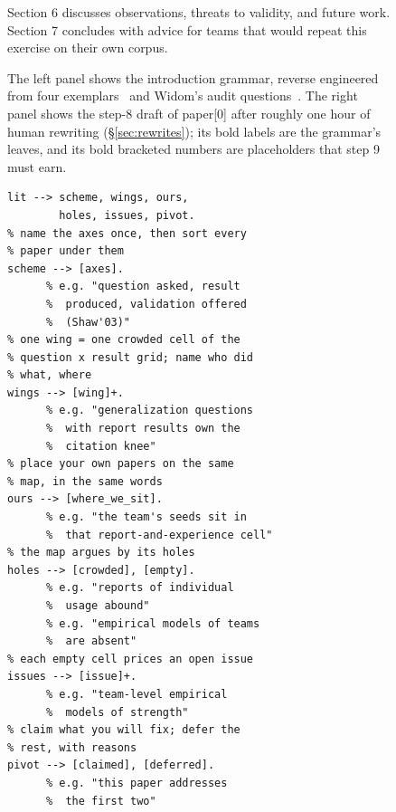 \begin{figure}[p]
{\begin{minipage}[t]{\dimexpr0.62\textwidth-2\fboxsep-2\fboxrule}
Section 6 discusses observations, threats to validity, and future
work.
Section 7 concludes with advice for teams that would repeat this
exercise on their own corpus.
\end{minipage}}
\vspace{6mm}
\caption{The left panel shows the introduction grammar, reverse
engineered from four
exemplars~\cite{shannon40,kocaguneli12,fu17,ladisa23} and Widom's
audit questions~\cite{widom06}.
The right panel shows the step-8 draft of {\ttfamily paper[0]}
after roughly one hour of human rewriting
(\S\ref{sec:rewrites}); its bold labels are the grammar's leaves,
and its bold bracketed numbers are placeholders that step 9 must
earn.}
\label{fig:introbnf}
\label{fig:sample}
\end{figure}

\begin{figure}[t!]
\begin{minipage}[t]{0.40\textwidth}
\begin{lstlisting}[style=dcg]
lit --> scheme, wings, ours,
        holes, issues, pivot.
% name the axes once, then sort every
% paper under them
scheme --> [axes].
      % e.g. "question asked, result
      %  produced, validation offered
      %  (Shaw'03)"
% one wing = one crowded cell of the
% question x result grid; name who did
% what, where
wings --> [wing]+.
      % e.g. "generalization questions
      %  with report results own the
      %  citation knee"
% place your own papers on the same
% map, in the same words
ours --> [where_we_sit].
      % e.g. "the team's seeds sit in
      %  that report-and-experience cell"
% the map argues by its holes
holes --> [crowded], [empty].
      % e.g. "reports of individual
      %  usage abound"
      % e.g. "empirical models of teams
      %  are absent"
% each empty cell prices an open issue
issues --> [issue]+.
      % e.g. "team-level empirical
      %  models of strength"
% claim what you will fix; defer the
% rest, with reasons
pivot --> [claimed], [deferred].
      % e.g. "this paper addresses
      %  the first two"
\end{lstlisting}
\end{minipage}\hfill
{}
\end{figure}
